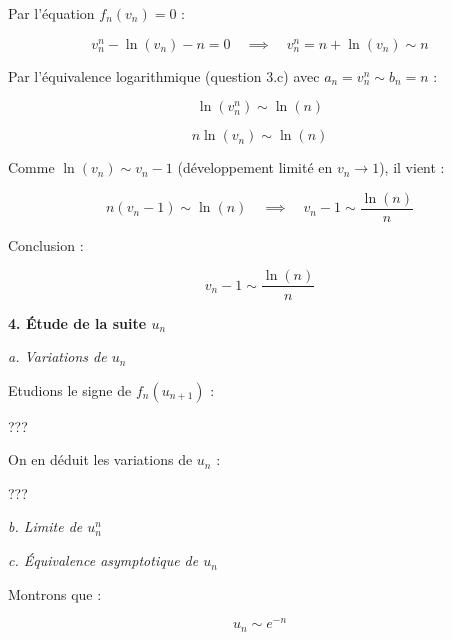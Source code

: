 \documentclass[10pt,a4paper]{article}
\begin{document}
Par l'équation \( f_n(v_n) = 0 \) :

\[
v_n^n - \ln(v_n) - n = 0 \quad \implies \quad v_n^n = n + \ln(v_n) \sim n
\]

Par l'équivalence logarithmique (question 3.c) avec \( a_n = v_n^n \sim b_n = n \) :

\[
\ln(v_n^n) \sim \ln(n)
\]

\[
n \ln(v_n) \sim \ln(n)
\]

Comme \( \ln(v_n) \sim v_n - 1 \) (développement limité en \( v_n \to 1 \)), il vient :

\[
n (v_n - 1) \sim \ln(n) \quad \implies \quad v_n - 1 \sim \frac{\ln(n)}{n}
\]

Conclusion :

\[
\boxed{v_n - 1 \sim \frac{\ln(n)}{n}}
\]


\bigskip
\textbf{4. Étude de la suite \( u_n \)}

\bigskip
\textit{a. Variations de \( u_n \)}

Etudions le signe de \( f_n(u_{n+1}) \) :

???

On en déduit les variations de \( u_n \) :

???

\bigskip
\textit{b. Limite de \( u_n^{n} \)}

\bigskip
\textit{c. Équivalence asymptotique de \( u_n \)}

Montrons que :

\[
    u_n \sim e^{-n}
\]
\end{document}
